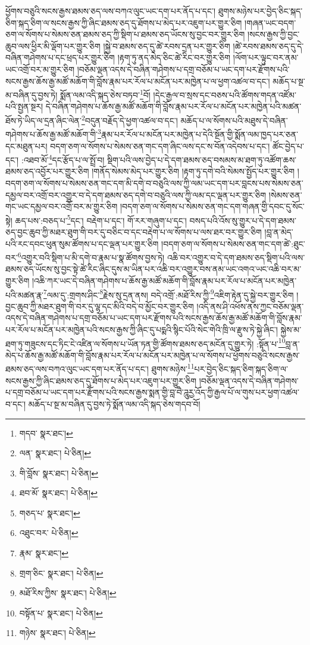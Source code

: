 ཕྱོགས་བཅུའི་སངས་རྒྱས་ཐམས་ཅད་ལས་བཀའ་ལུང་ཡང་དག་པར་ནོད་པ་དང་། ཐུགས་མཉེས་པར་བྱེད་ཅིང་སྐད་ཅིག་སྐད་ཅིག་ལ་སངས་རྒྱས་ཀྱི་ཞིང་ཐམས་ཅད་དུ་ཐོགས་པ་མེད་པར་འཇུག་པར་གྱུར་ཅིག །གཞན་ཡང་བདག་ཅག་ལ་སོགས་པ་སེམས་ཅན་ཐམས་ཅད་ཀྱི་སྡིག་པ་ཐམས་ཅད་ཡོངས་སུ་བྱང་བར་གྱུར་ཅིག །སངས་རྒྱས་ཀྱི་བྱང་ཆུབ་ལས་ཕྱིར་མི་ལྡོག་པར་གྱུར་ཅིག །སྐྱེ་བ་ཐམས་ཅད་དུ་ཚེ་རབས་དྲན་པར་གྱུར་ཅིག །ཚེ་རབས་ཐམས་ཅད་དུ་དེ་བཞིན་གཤེགས་པ་དང་ཕྲད་པར་གྱུར་ཅིག །རྟག་ཏུ་ནད་མེད་ཅིང་ཚེ་རིང་བར་གྱུར་ཅིག །ལོག་པར་ལྟུང་བར་ནམ་ཡང་འགྲོ་བར་མ་གྱུར་ཅིག །བཅོམ་ལྡན་འདས་དེ་བཞིན་གཤེགས་པ་དགྲ་བཅོམ་པ་ཡང་དག་པར་རྫོགས་པའི་སངས་རྒྱས་ཆོས་རྒྱ་མཚོ་མཆོག་གི་བློས་རྣམ་པར་རོལ་པ་མངོན་པར་མཁྱེན་པ་ལ་ཕྱག་འཚལ་བ་དང་། མཆོད་པ་སྔ་མ་བཞིན་དུ་བྱས་ཏེ། སྨོན་ལམ་འདི་སྐད་ཅེས་བཏབ་\footnote{གདབ་  སྣར་ཐང་། }བོ། །དེང་རྒྱལ་བ་སྲས་དང་བཅས་པའི་ཚོགས་གདན་འཛོམ་པའི་སྤྱན་སྔར། དེ་བཞིན་གཤེགས་པ་ཆོས་རྒྱ་མཚོ་མཆོག་གི་བློས་རྣམ་པར་རོལ་པ་མངོན་པར་མཁྱེན་པའི་མཚན་ཐོས་ཏེ་ཡིད་ལ་དྲན་ཞིང་ལེན་\footnote{ལན་  སྣར་ཐང་།  པེ་ཅིན། }བདུན་བརྗོད་དེ་ཕྱག་འཚལ་བ་དང་། མཆོད་པ་ལ་སོགས་པའི་མཐུས་དེ་བཞིན་གཤེགས་པ་ཆོས་རྒྱ་མཚོ་མཆོག་གི་\footnote{གི་བློས་  སྣར་ཐང་།  པེ་ཅིན། }རྣམ་པར་རོལ་པ་མངོན་པར་མཁྱེན་པ་དེའི་སྔོན་གྱི་སྨོན་ལམ་ཁྱད་པར་ཅན་དང་མཐུན་པར། བདག་ཅག་ལ་སོགས་པ་སེམས་ཅན་གང་དག་ཞིང་ལས་དང་ས་བོན་འདེབས་པ་དང་། ཚོང་བྱེད་པ་དང་། :འཐབ་མོ་\footnote{ཐབ་མོ་  སྣར་ཐང་།  པེ་ཅིན། }དང་རྩོད་པ་ལ་སྤྲོ་བ། སྡིག་པའི་ལས་བྱེད་པ་དེ་དག་ཐམས་ཅད་བསམས་མ་ཐག་ཏུ་འཚོག་ཆས་ཐམས་ཅད་འབྱོར་པར་གྱུར་ཅིག །གནོད་སེམས་མེད་པར་གྱུར་ཅིག །རྟག་ཏུ་དགེ་བའི་སེམས་སྤྱོད་པར་གྱུར་ཅིག །བདག་ཅག་ལ་སོགས་པ་སེམས་ཅན་གང་དག་མི་དགེ་བ་བཅུའི་ལས་ཀྱི་ལམ་ཡང་དག་པར་བླངས་པས་སེམས་ཅན་དམྱལ་བར་འགྲོ་བར་འགྱུར་བ་དེ་དག་ཐམས་ཅད་དགེ་བ་བཅུའི་ལས་ཀྱི་ལམ་དང་ལྡན་པར་གྱུར་ཅིག །སེམས་ཅན་གང་ཡང་དམྱལ་བར་འགྲོ་བར་མ་གྱུར་ཅིག །བདག་ཅག་ལ་སོགས་པ་སེམས་ཅན་གང་དག་གཞན་གྱི་དབང་དུ་སོང་སྟེ། ཆད་པས་:བཅད་པ་\footnote{གཅད་པ་  སྣར་ཐང་། }དང་། བརྡེག་པ་དང་། གོ་རར་གཞུག་པ་དང་། བསད་པའི་འོས་སུ་གྱུར་པ་དེ་དག་ཐམས་ཅད་བྱང་ཆུབ་ཀྱི་མཐར་ཐུག་གི་བར་དུ་བཅིང་བ་དང་བརྡེག་པ་ལ་སོགས་པ་ལས་ཐར་བར་གྱུར་ཅིག །བླ་ན་མེད་པའི་རང་དབང་ཕུན་སུམ་ཚོགས་པ་དང་ལྡན་པར་གྱུར་ཅིག །བདག་ཅག་ལ་སོགས་པ་སེམས་ཅན་གང་དག་ཚེ་:ཐུང་བར་\footnote{འཐུང་བར་  པེ་ཅིན། }འགྱུར་བའི་སྡིག་པ་མི་དགེ་བ་རྣམ་པ་སྣ་ཚོགས་བྱས་ཏེ། འཆི་བར་འགྱུར་བ་དེ་དག་ཐམས་ཅད་སྡིག་པའི་ལས་ཐམས་ཅད་ཡོངས་སུ་བྱང་སྟེ་ཚེ་རིང་ཞིང་དུས་མ་ཡིན་པར་འཆི་བར་འགྱུར་བས་ནམ་ཡང་འགའ་ཡང་འཆི་བར་མ་གྱུར་ཅིག །འཆི་ཀར་ཡང་དེ་བཞིན་གཤེགས་པ་ཆོས་རྒྱ་མཚོ་མཆོག་གི་བློས་རྣམ་པར་རོལ་པ་མངོན་པར་མཁྱེན་པའི་མཚན་རྣ་\footnote{རྣམ་  སྣར་ཐང་། }ལམ་དུ་:གྲགས་ཤིང་\footnote{གྲག་ཅིང་  སྣར་ཐང་།  པེ་ཅིན། }རྗེས་སུ་དྲན་ནས། བདེ་འགྲོ་:མཐོ་རིས་ཀྱི་\footnote{མཐོ་རིས་ཀྱིས་  སྣར་ཐང་།  པེ་ཅིན། }འཇིག་རྟེན་དུ་སྐྱེ་བར་གྱུར་ཅིག །བྱང་ཆུབ་ཀྱི་མཐར་ཐུག་གི་བར་དུ་ལྷ་དང་མིའི་བདེ་བ་མྱོང་བར་གྱུར་ཅིག །འདི་ནས་ཤི་འཕོས་ནས་ཀྱང་བཅོམ་ལྡན་འདས་དེ་བཞིན་གཤེགས་པ་དགྲ་བཅོམ་པ་ཡང་དག་པར་རྫོགས་པའི་སངས་རྒྱས་ཆོས་རྒྱ་མཚོ་མཆོག་གི་བློས་རྣམ་པར་རོལ་པ་མངོན་པར་མཁྱེན་པའི་སངས་རྒྱས་ཀྱི་ཞིང་དུ་པདྨའི་སྙིང་པོའི་སེང་གེའི་ཁྲི་ལ་རྫུས་ཏེ་སྐྱེ་ཞིང་། སྐྱེས་མ་ཐག་ཏུ་གཟུངས་དང་ཏིང་ངེ་འཛིན་ལ་སོགས་པ་ཡོན་ཏན་གྱི་ཚོགས་ཐམས་ཅད་མངོན་དུ་གྱུར་ཏེ། :སྟོན་པ་\footnote{བསྟོན་པ་  སྣར་ཐང་།  པེ་ཅིན། }བླ་ན་མེད་པ་ཆོས་རྒྱ་མཚོ་མཆོག་གི་བློས་རྣམ་པར་རོལ་པ་མངོན་པར་མཁྱེན་པ་ལ་སོགས་པ་ཕྱོགས་བཅུའི་སངས་རྒྱས་ཐམས་ཅད་ལས་བཀའ་ལུང་ཡང་དག་པར་ནོད་པ་དང་། ཐུགས་མཉེས་\footnote{གཉེས་  སྣར་ཐང་།  པེ་ཅིན། }པར་བྱེད་ཅིང་སྐད་ཅིག་སྐད་ཅིག་ལ་སངས་རྒྱས་ཀྱི་ཞིང་ཐམས་ཅད་དུ་ཐོགས་པ་མེད་པར་འཇུག་པར་གྱུར་ཅིག །བཅོམ་ལྡན་འདས་དེ་བཞིན་གཤེགས་པ་དགྲ་བཅོམ་པ་ཡང་དག་པར་རྫོགས་པའི་སངས་རྒྱས་སྨན་གྱི་བླ་བཻ་ཌཱུརྱ་འོད་ཀྱི་རྒྱལ་པོ་ལ་གུས་པར་ཕྱག་འཚལ་བ་དང་། མཆོད་པ་སྔ་མ་བཞིན་དུ་བྱས་ཏེ་སྨོན་ལམ་འདི་སྐད་ཅེས་གདབ་བོ། 